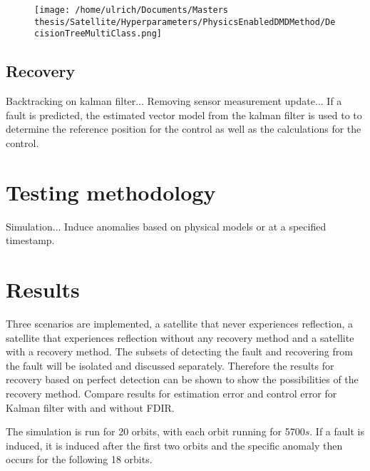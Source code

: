 \documentclass[letterpaper, 10 pt, conference]{ieeeconf}  %
\begin{document}
\begin{figure}[!htb]
\texttt{[image: /home/ulrich/Documents/Masters thesis/Satellite/Hyperparameters/PhysicsEnabledDMDMethod/DecisionTreeMultiClass.png]}
\end{figure}


\subsection{Recovery}
Backtracking on kalman filter... Removing sensor measurement update... If a fault is predicted, the estimated vector model from the kalman filter is used to to determine the reference position for the control as well as the calculations for the control.

\section{Testing methodology}
Simulation... Induce anomalies based on physical models or at a specified timestamp.

\section{Results}
Three scenarios are implemented, a satellite that never experiences reflection, a satellite that experiences reflection without any recovery method and a satellite with a recovery method. The subsets of detecting the fault and recovering from the fault will be isolated and discussed separately. Therefore the results for recovery based on perfect detection can be shown to show the possibilities of the recovery method.
Compare results for estimation error and control error for Kalman filter with and without FDIR.

The simulation is run for 20 orbits, with each orbit running for 5700$s$. If a fault is induced, it is induced after the first two orbits and the specific anomaly then occurs for the following 18 orbits.
\end{document}
